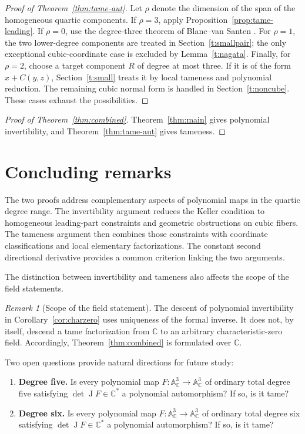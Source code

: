 \documentclass[11pt,reqno]{amsart}
\numberwithin{equation}{section}
\theoremstyle{plain}
\theoremstyle{definition}
\theoremstyle{remark}
\newtheorem{remark}[theorem]{Remark}
\newcommand{\C}{\mathbb C}
\newcommand{\A}{\mathbb A}
\newcommand{\J}{\operatorname J}
\begin{document}
\begin{proof}[Proof of Theorem~\ref{thm:tame-aut}]
Let $\rho$ denote the dimension of the span of the homogeneous quartic
components. If $\rho=3$, apply Proposition~\ref{prop:tame-leading}.
If $\rho=0$, use the degree-three theorem of Blanc--van Santen
\cite[Corollary~3.9.5]{BVS}. For $\rho=1$, the two lower-degree components
are treated in Section~\ref{t:smallpair}; the only exceptional cubic-coordinate
case is excluded by Lemma~\ref{t:nagata}.
Finally, for $\rho=2$, choose a target component $R$ of degree at most
three. If it is of the form $x+C(y,z)$, Section~\ref{t:small} treats it
by local tameness and polynomial reduction. The remaining cubic normal
form is handled in Section~\ref{t:noncube}. These cases exhaust the
possibilities.
\end{proof}

\begin{proof}[Proof of Theorem~\ref{thm:combined}]
Theorem~\ref{thm:main} gives polynomial invertibility, and
Theorem~\ref{thm:tame-aut} gives tameness.
\end{proof}

\section{Concluding remarks}\label{sec:conclusion}
The two proofs address complementary aspects of polynomial maps in the
quartic degree range. The invertibility argument reduces the Keller
condition to homogeneous leading-part constraints and geometric
obstructions on cubic fibers. The tameness argument then combines those
constraints with coordinate classifications and local elementary
factorizations. The constant second directional derivative provides a
common criterion linking the two arguments.

The distinction between invertibility and tameness also affects the scope
of the field statements.
\begin{remark}[Scope of the field statement]
The descent of polynomial invertibility in Corollary~\ref{cor:charzero}
uses uniqueness of the formal inverse. It does not, by itself, descend a
tame factorization from $\C$ to an arbitrary characteristic-zero field.
Accordingly, Theorem~\ref{thm:combined} is formulated over $\C$.
\end{remark}

Two open questions provide natural directions for future study:
\begin{enumerate}[label=\textup{(\arabic*)}]
\item \textbf{Degree five.} Is every polynomial map
$F:\A^3_\C\to\A^3_\C$ of ordinary total degree five satisfying
$\det\J F\in\C^*$ a polynomial automorphism? If so, is it tame?
\item \textbf{Degree six.} Is every polynomial map
$F:\A^3_\C\to\A^3_\C$ of ordinary total degree six satisfying
$\det\J F\in\C^*$ a polynomial automorphism? If so, is it tame?
\end{enumerate}
\end{document}
